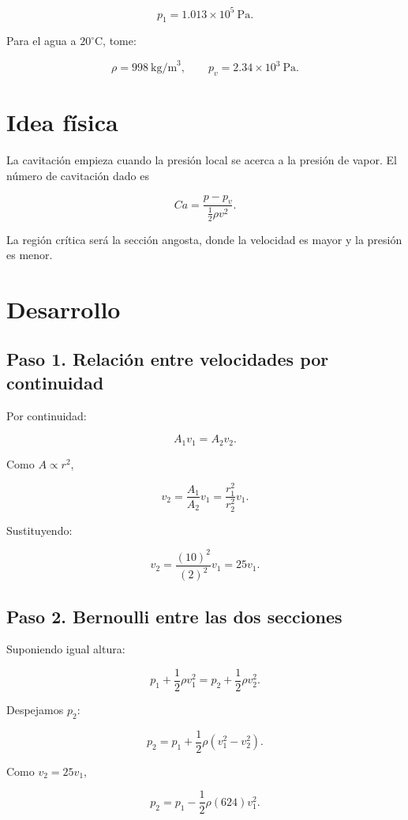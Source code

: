 \documentclass[
  letterpaper,
  DIV=11,
  numbers=noendperiod]{scrreprt}
\begin{document}
\[
p_1 = 1.013\times10^5\ \text{Pa}.
\]

Para el agua a \(20^\circ\)C, tome:

\[
\rho=998\ \text{kg/m}^3,
\qquad
p_v = 2.34\times10^3\ \text{Pa}.
\]

\section{Idea física}\label{idea-fuxedsica-3}

La cavitación empieza cuando la presión local se acerca a la presión de
vapor. El número de cavitación dado es

\[
Ca = \frac{p-p_v}{\tfrac12\rho v^2}.
\]

La región crítica será la sección angosta, donde la velocidad es mayor y
la presión es menor.

\section{Desarrollo}\label{desarrollo-1}

\subsection{Paso 1. Relación entre velocidades por
continuidad}\label{paso-1.-relaciuxf3n-entre-velocidades-por-continuidad}

Por continuidad:

\[
A_1v_1=A_2v_2.
\]

Como \(A\propto r^2\),

\[
v_2 = \frac{A_1}{A_2}v_1 = \frac{r_1^2}{r_2^2}v_1.
\]

Sustituyendo:

\[
v_2 = \frac{(10)^2}{(2)^2}v_1 = 25v_1.
\]

\subsection{Paso 2. Bernoulli entre las dos
secciones}\label{paso-2.-bernoulli-entre-las-dos-secciones}

Suponiendo igual altura:

\[
p_1 + \frac12\rho v_1^2 = p_2 + \frac12\rho v_2^2.
\]

Despejamos \(p_2\):

\[
p_2 = p_1 + \frac12\rho\left(v_1^2-v_2^2\right).
\]

Como \(v_2=25v_1\),

\[
p_2 = p_1 - \frac12\rho(624)v_1^2.
\]
\end{document}

